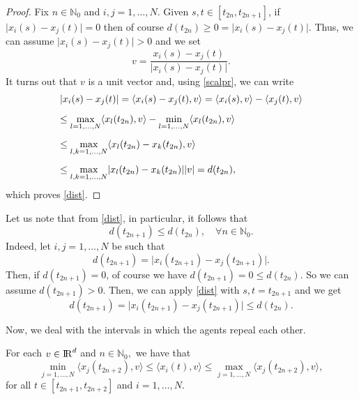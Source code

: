 \documentclass[a4paper,11pt,oneside]{article}
\newcommand{\RR}{{{\rm I} \kern -.15em {\rm R} }}
\begin{document}
	\begin{proof}
		Fix $n\in\mathbb{N}_{0}$ and $i,j=1,\dots,N$. Given $s,t\in [t_{2n},t_{2n+1}]$, if $\lvert x_{i}(s)-x_{j}(t)\rvert=0$ then of course $d(t_{2n})\geq 0=\lvert x_{i}(s)-x_{j}(t)\rvert$. Thus, we can assume $\lvert x_{i}(s)-x_{j}(t)\rvert>0$ and we set $$v=\frac{x_{i}(s)-x_{j}(t)}{\lvert x_{i}(s)-x_{j}(t)\rvert}.$$
		It turns out that $v$ is a unit vector and, using \eqref{scalpr}, we can write 
		$$\begin{array}{l}
			\vspace{0.3cm}\displaystyle{\lvert x_{i}(s)-x_{j}(t)\rvert=\langle x_{i}(s)-x_{j}(t),v\rangle=\langle x_{i}(s),v\rangle-\langle x_{j}(t),v\rangle}\\
			\vspace{0.3cm}\displaystyle{\leq \max_{l=1,\dots,N}\langle x_{l}(t_{2n}),v\rangle-\min_{l=1,\dots,N}\langle x_{l}(t_{2n}),v\rangle}\\
			\vspace{0.3cm}\displaystyle{\leq \max_{l,k=1,\dots,N}\langle x_{l}(t_{2n})-x_{k}(t_{2n}),v\rangle}	\\
			\displaystyle{\leq \max_{l,k=1,\dots,N}\lvert x_{l}(t_{2n})-x_{k}(t_{2n})\rvert\lvert v\rvert=d(t_{2n}),}
		\end{array}$$
		which proves \eqref{dist}.
	\end{proof}
	\begin{oss}
		Let us note that from \eqref{dist}, in particular, it follows that
		\begin{equation}\label{dec}
			d(t_{2n+1})\leq d(t_{2n}),\quad \forall n\in \mathbb{N}_{0}.
		\end{equation}
		Indeed, let $i,j=1,\dots,N$ be such that $$d(t_{2n+1})=\lvert x_{i}(t_{2n+1})-x_{j}(t_{2n+1})\rvert.$$
		Then, if $d(t_{2n+1})=0$, of course we have $d(t_{2n+1})=0\leq d(t_{2n})$. So we can assume $d(t_{2n+1})>0$.
		Then, we can apply \eqref{dist} with $s,t=t_{2n+1}$ and we get $$d(t_{2n+1})=\lvert x_{i}(t_{2n+1})-x_{j}(t_{2n+1})\rvert\leq d(t_{2n}).$$
	\end{oss} 
	Now, we deal with the intervals in which the agents repeal each other. 	\begin{lem}\label{L1-1}
		For each $v\in \RR^{d}$ and $n\in \mathbb{N}_0,$  we have that 
		\begin{equation}\label{scalpr-1}
			\min_{j=1,\dots,N}\langle x_{j}(t_{2n+2}),v\rangle\leq \langle x_{i}(t),v\rangle\leq \max_{j=1,\dots,N}\langle x_{j}(t_{2n+2}),v\rangle,
		\end{equation}for all  $t\in [t_{2n+1},t_{2n+2}]$ and $i=1,\dots,N$. 
	\end{lem}
\end{document}
